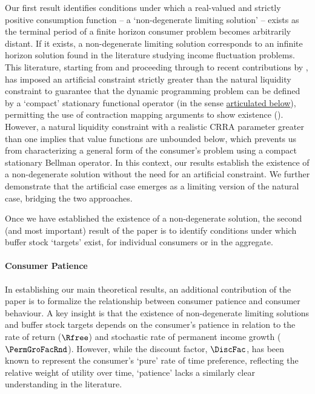 \documentclass[BufferStockTheory]{subfiles}
\begin{document}
Our first result identifies conditions under which a real-valued and strictly positive consumption function -- a `non-degenerate limiting solution' -- exists as the terminal period of a finite horizon consumer problem becomes arbitrarily distant.
If it exists, a non-degenerate limiting solution corresponds to an infinite horizon solution found in the literature studying income fluctuation problems.
This literature, starting from \cite{bewleyPIH} and proceeding through to recent contributions by \cite{mstIncFluct,maUnboundedDP}, has imposed an artificial constraint strictly greater than the natural liquidity constraint to guarantee that the dynamic programming problem can be defined by a `compact' stationary functional operator (in the sense \hyperlink{challengesDP}{articulated below}), permitting the use of contraction mapping arguments to show existence (\cite{maUnboundedDP, stachurski2022}).
However, a natural liquidity constraint with a realistic CRRA parameter greater than one implies that value functions are unbounded below, which prevents us from characterizing a general form of the consumer's problem using a compact stationary Bellman operator.
In this context, our results establish the existence of a non-degenerate solution without the need for an artificial constraint.
We further demonstrate that the artificial case emerges as a limiting version of the natural case, bridging the two approaches.

Once we have established the existence of a non-degenerate solution, the second (and most important) result of the paper is to identify conditions under which buffer stock `targets' exist, for individual consumers or in the aggregate.


\paragraph{Consumer Patience}

In establishing our main theoretical results, an additional contribution of the paper is to formalize the relationship between consumer patience and consumer behaviour.
A key insight is that the existence of non-degenerate limiting solutions and buffer stock targets depends on the consumer's patience in relation to the rate of return ($\Rfree$) and stochastic rate of permanent income growth ($\PermGroFacRnd$).
However, while the discount factor, $\DiscFac$, has been known to represent the consumer's `pure' rate of time preference, reflecting the relative weight of utility over time, `patience' lacks a similarly clear understanding in the literature.
\end{document}
